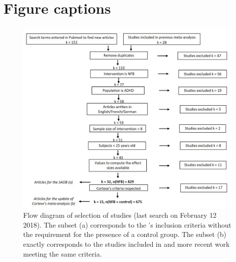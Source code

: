 \section*{Figure captions}

\begin{figure}[h!]
  \centering
	\includegraphics[width=1.0\linewidth]{figures/meta_review_factors_analysis_how_studies_are_included_no_colors_2-columns_fitting_ima.jpg} 
  \caption{Flow diagram of selection of studies (last search on February 12 2018).  
	The subset (a) corresponds to the \citeauthor{Cortese2016}'s inclusion criteria without the requirement for 
	the presence of a control group.
	The subset (b) exactly corresponds to the studies included in \citet{Cortese2016} and more recent work meeting the same criteria.}
  \label{Figure:systematic_review_workflow}
\end{figure}

